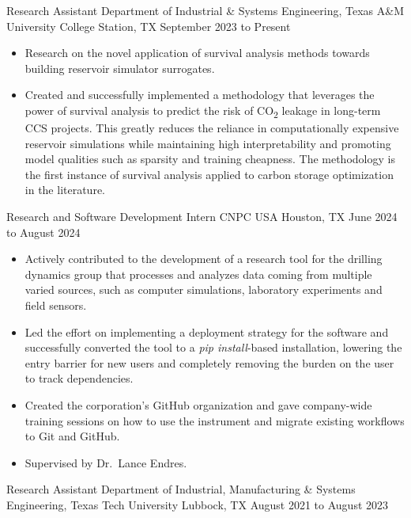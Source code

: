 
\cvjob
    {Research Assistant}
    {Department of Industrial \& Systems Engineering, Texas A\&M University}
    {College Station, TX}
    {September 2023 to Present}

\begin{itemize}
    \item Research on the novel application of survival analysis methods towards building reservoir simulator
    surrogates.
    \item Created and successfully implemented a methodology that leverages the power of survival analysis to predict
    the risk of CO\textsubscript{2} leakage in long-term CCS projects.
    This greatly reduces the reliance in computationally expensive reservoir simulations while maintaining high
    interpretability and promoting model qualities such as sparsity and training cheapness.
    The methodology is the first instance of survival analysis applied to carbon storage optimization in the literature.
\end{itemize}

\cvjob
    {Research and Software Development Intern}
    {CNPC USA}
    {Houston, TX}
    {June 2024 to August 2024}

\begin{itemize}
    \item Actively contributed to the development of a research tool for the drilling dynamics group that processes and
    analyzes data coming from multiple varied sources, such as computer simulations, laboratory experiments and field
    sensors.
    \item Led the effort on implementing a deployment strategy for the software and successfully converted the tool to a
    \textit{pip install}-based installation, lowering the entry barrier for new users and completely removing the burden
    on the user to track dependencies.
    \item Created the corporation's GitHub organization and gave company-wide training sessions on how to use the
    instrument and migrate existing workflows to Git and GitHub.
    \item Supervised by Dr.\ Lance Endres.
\end{itemize}

\cvjob
    {Research Assistant}
    {Department of Industrial, Manufacturing \& Systems Engineering, Texas Tech University}
    {Lubbock, TX}
    {August 2021 to August 2023}

